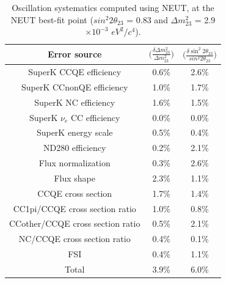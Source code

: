 \begin{table}[htb]
\center
\renewcommand{\arraystretch}{1.75} %
\begin{tabular}{|c|cc|}
\hline
Error source  &
  $\Big(\frac{\delta{\Delta m^{2}_{23}}}{\Delta m^{2}_{23}}\Big)$  & $\Big(\frac{\delta{\sin^{2}2\theta_{23}}}{sin^{2}2\theta_{23}}\Big)$  \\
\hline
SuperK CCQE efficiency            &   0.6\%   &   2.6\%      \\
SuperK CCnonQE efficiency         &   1.0\%   &   1.7\%      \\
SuperK NC efficiency              &   1.6\%   &   1.5\%      \\
SuperK $\nu_{e}$ CC efficiency    &   0.0\%   &   0.0\%      \\
SuperK energy scale               &   0.5\%   &   0.4\%      \\
ND280 efficiency                  &   0.2\%   &   2.1\%      \\
Flux normalization                &   0.3\%   &   2.6\%      \\
Flux shape                        &   2.3\%   &   1.1\%      \\
CCQE cross section                &   1.7\%   &   1.4\%      \\
CC1pi/CCQE cross section ratio    &   1.0\%   &   0.8\%      \\
CCother/CCQE cross section ratio  &   0.5\%   &   2.1\%      \\
NC/CCQE cross section ratio       &   0.4\%   &   0.1\%      \\
FSI                               &   0.4\%   &   1.1\%      \\
\hline
Total                             &   3.9\%   &   6.0\%      \\
\hline
\end{tabular}\\[2pt]
\caption{
  Oscillation systematics computed using NEUT, at the NEUT best-fit point
  ($sin^{2}2\theta_{23}$ = 0.83 and $\Delta m^{2}_{23}$ = 2.9$\times10^{-3}$ $eV^{2}/c^{4}$).
}
\label{table:oscsyst_at_neut_bestfit_point}
\end{table}



